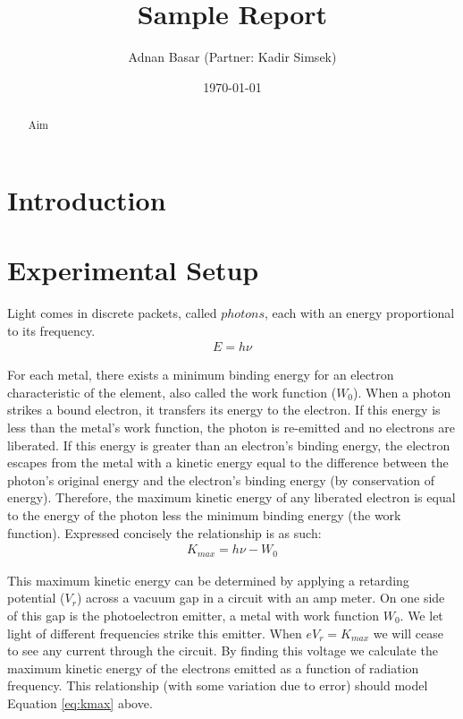 \documentclass[aps,twocolumn,secnumarabic,nobalancelastpage,amsmath,amssymb,
nofootinbib]{revtex4}
\begin{document}
\title{Sample Report}
\author         {Adnan Basar (Partner: Kadir Simsek)}
\date{\today}





\begin{abstract}
Aim
\end{abstract}

\maketitle

\section{Introduction}



\section{Experimental Setup}

Light comes in discrete packets, called $photons$, each with an energy proportional to its frequency.  
\begin{align}
E = h\nu
\end{align}

For each metal, there exists a minimum binding energy for an electron characteristic of the element, also called the work function ($W_0$).  When a photon strikes a bound electron, it transfers its energy to the electron.  If this energy is less than the metal's work function, the photon is re-emitted and no electrons are liberated.  If this energy is greater than an electron's binding energy, the electron escapes from the metal with a kinetic energy equal to the difference between the photon's original energy and the electron's binding energy (by conservation of energy).  Therefore, the maximum kinetic energy of any liberated electron is equal to the energy of the photon less the minimum binding energy (the work function).  Expressed concisely the relationship is as such:
\begin{align}
\label{eq:kmax}
K_{max} = h\nu - W_0
\end{align}

This maximum kinetic energy can be determined by applying a retarding potential ($V_r$) across a vacuum gap in a circuit with an amp meter.  On one side of this gap is the photoelectron emitter, a metal with work function $W_0$.  We let light of different frequencies strike this emitter.  When $eV_r = K_{max}$ we will cease to see any current through the circuit.  By finding this voltage we calculate the maximum kinetic energy of the electrons emitted as a function of radiation frequency.  This relationship (with some variation due to error) should model Equation \ref{eq:kmax} above.
\end{document}
